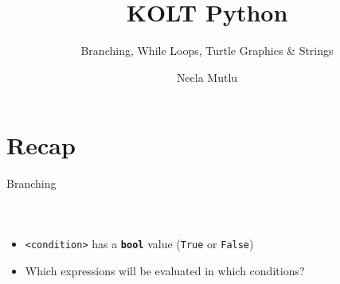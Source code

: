 

\usepackage{../KU-Beamer-Template/style/koc} 
\usepackage{minted}
\usepackage{upquote}
\usepackage{graphicx}

\title{KOLT Python} 
\subtitle{Branching, While Loops, Turtle Graphics \& Strings} 
\date{}
\author{Necla Mutlu}





    \maketitle


    \section{Recap}

        \begin{frame}{Branching}
            \vspace{-3mm}
            \begin{columns}
                \inputminted[firstline=1, lastline=4, frame=single,framesep=2pt]{python3}{../Lecture2/code-examples/branching.py}
                \inputminted[firstline=6, lastline=13, frame=single,framesep=2pt]{python3}{../Lecture2/code-examples/branching.py}
                \inputminted[firstline=15, lastline=27, frame=single,framesep=2pt]{python3}{../Lecture2/code-examples/branching.py}
            \end{columns}
            \begin{itemize}
                \item \texttt{<condition>} has a \textbf{\texttt{bool}} value (\texttt{True} or \texttt{False})
                \item Which expressions will be evaluated in which conditions?
            \end{itemize}
        \end{frame}


